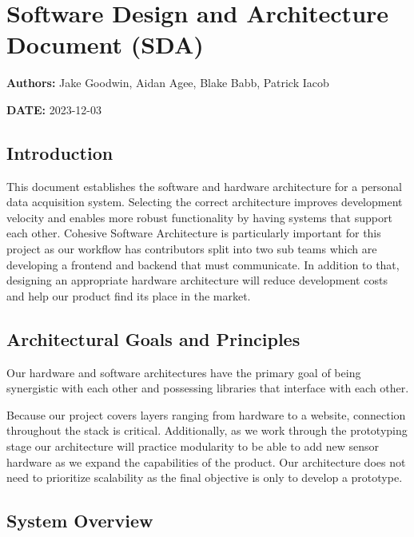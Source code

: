 \hypertarget{software-design-and-architecture-document-sda}{%
\section{Software Design and Architecture Document
(SDA)}\label{software-design-and-architecture-document-sda}}

\textbf{Authors:} Jake Goodwin, Aidan Agee, Blake Babb, Patrick Iacob

\textbf{DATE:} 2023-12-03

\hypertarget{introduction}{%
\subsection{Introduction}\label{introduction}}

This document establishes the software and hardware architecture for a
personal data acquisition system. Selecting the correct architecture
improves development velocity and enables more robust functionality by
having systems that support each other. Cohesive Software Architecture
is particularly important for this project as our workflow has
contributors split into two sub teams which are developing a frontend
and backend that must communicate. In addition to that, designing an
appropriate hardware architecture will reduce development costs and help
our product find its place in the market.

\hypertarget{architectural-goals-and-principles}{%
\subsection{Architectural Goals and
Principles}\label{architectural-goals-and-principles}}

Our hardware and software architectures have the primary goal of being
synergistic with each other and possessing libraries that interface with
each other.

Because our project covers layers ranging from hardware to a website,
connection throughout the stack is critical. Additionally, as we work
through the prototyping stage our architecture will practice modularity
to be able to add new sensor hardware as we expand the capabilities of
the product. Our architecture does not need to prioritize scalability as
the final objective is only to develop a prototype.

\hypertarget{system-overview}{%
\subsection{System Overview}\label{system-overview}}

